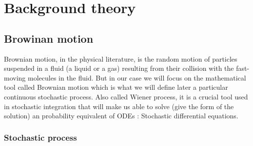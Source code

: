 \chapter{Background theory}
\section{Browinan motion}

Brownian motion, in the physical literature, is the random motion of particles suspended in a fluid (a liquid or a gas) resulting from their collision with the fast-moving molecules in the fluid.
But in our case we will focus on the mathematical tool called Brownian motion which is what we will define later a particular continuous stochastic process. Also called Wiener process, it is a crucial tool used in stochastic integration that will make us able to solve (give the form of the solution) an probability equivalent of ODEs : Stochastic differential equations.

\subsection{Stochastic process}

